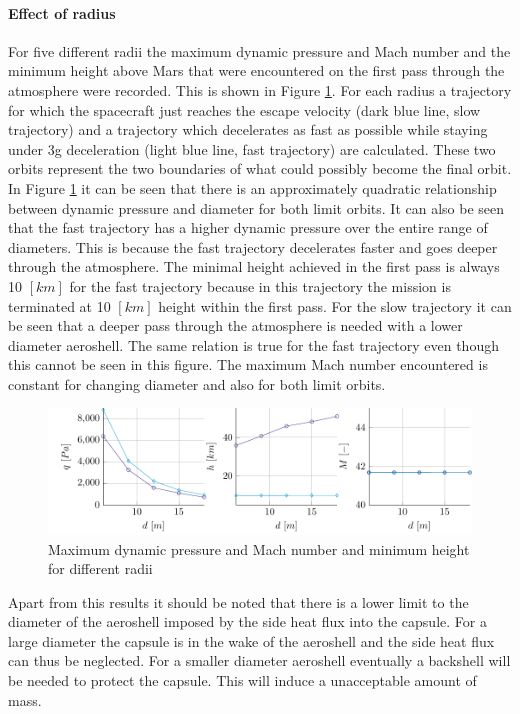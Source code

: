 \paragraph{Effect of radius}
For five different radii the maximum dynamic pressure and Mach number and the minimum height above Mars that were encountered on the first pass through the atmosphere were recorded. This is shown in Figure \ref{fig:radius}. For each radius a trajectory for which the spacecraft just reaches the escape velocity (dark blue line, slow trajectory) and a trajectory which decelerates as fast as possible while staying under 3g deceleration (light blue line, fast trajectory) are calculated. These two orbits represent the two boundaries of what could possibly become the final orbit. In Figure \ref{fig:radius} it can be seen that there is an approximately quadratic relationship between dynamic pressure and diameter for both limit orbits. It can also be seen that the fast trajectory has a higher dynamic pressure over the entire range of diameters. This is because the fast trajectory decelerates faster and goes deeper through the atmosphere. The minimal height achieved in the first pass is always 10 $\left[km\right]$ for the fast trajectory because in this trajectory the mission is terminated at 10 $\left[km\right]$ height within the first pass. For the slow trajectory it can be seen that a deeper pass through the atmosphere is needed with a lower diameter aeroshell. The same relation is true for the fast trajectory even though this cannot be seen in this figure. The maximum Mach number encountered is constant for changing diameter and also for both limit orbits.

\begin{figure}[h]
	\centering
	\includegraphics[width=\textwidth]{./Figure/orbit/radius_param.pdf}
	\caption{Maximum dynamic pressure and Mach number and minimum height for different radii}
	\label{fig:radius}
\end{figure}

Apart from this results it should be noted that there is a lower limit to the diameter of the aeroshell imposed by the side heat flux into the capsule. For a large diameter the capsule is in the wake of the aeroshell and the side heat flux can thus be neglected. For a smaller diameter aeroshell eventually a backshell will be needed to protect the capsule. This will induce a unacceptable amount of mass.

